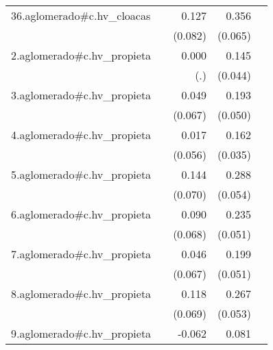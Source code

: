 {\begin{longtable}{l*{4}{D{.}{.}{-1}}}
\addlinespace
36.aglomerado#c.hv\_cloacas&                     &       0.127         &       0.356\sym{***}&                     \\
            &                     &     (0.082)         &     (0.065)         &                     \\
\addlinespace
2.aglomerado#c.hv\_propieta&                     &       0.000         &       0.145\sym{***}&                     \\
            &                     &         (.)         &     (0.044)         &                     \\
\addlinespace
3.aglomerado#c.hv\_propieta&                     &       0.049         &       0.193\sym{***}&                     \\
            &                     &     (0.067)         &     (0.050)         &                     \\
\addlinespace
4.aglomerado#c.hv\_propieta&                     &       0.017         &       0.162\sym{***}&                     \\
            &                     &     (0.056)         &     (0.035)         &                     \\
\addlinespace
5.aglomerado#c.hv\_propieta&                     &       0.144\sym{*}  &       0.288\sym{***}&                     \\
            &                     &     (0.070)         &     (0.054)         &                     \\
\addlinespace
6.aglomerado#c.hv\_propieta&                     &       0.090         &       0.235\sym{***}&                     \\
            &                     &     (0.068)         &     (0.051)         &                     \\
\addlinespace
7.aglomerado#c.hv\_propieta&                     &       0.046         &       0.199\sym{***}&                     \\
            &                     &     (0.067)         &     (0.051)         &                     \\
\addlinespace
8.aglomerado#c.hv\_propieta&                     &       0.118         &       0.267\sym{***}&                     \\
            &                     &     (0.069)         &     (0.053)         &                     \\
\addlinespace
9.aglomerado#c.hv\_propieta&                     &      -0.062         &       0.081         &                     \\

\end{longtable}}
